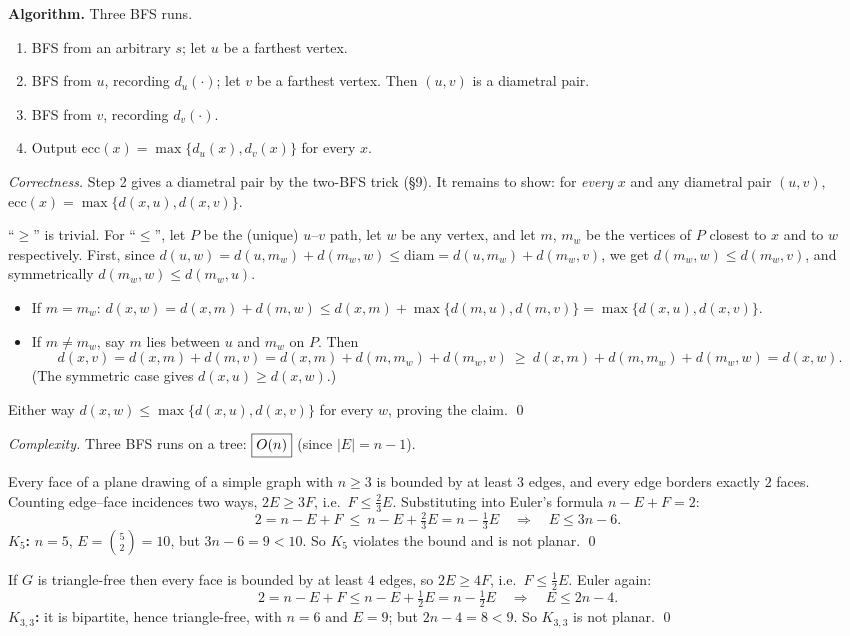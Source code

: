 \textbf{Algorithm.} Three BFS runs.
\begin{enumerate}
  \item BFS from an arbitrary $s$; let $u$ be a farthest vertex.
  \item BFS from $u$, recording $d_u(\cdot)$; let $v$ be a farthest vertex. Then $(u,v)$ is a
        diametral pair.
  \item BFS from $v$, recording $d_v(\cdot)$.
  \item Output $\mathrm{ecc}(x)=\max\{d_u(x),d_v(x)\}$ for every $x$.
\end{enumerate}
\emph{Correctness.} Step 2 gives a diametral pair by the two-BFS trick (\S9). It remains to show:
for \emph{every} $x$ and any diametral pair $(u,v)$,
$\mathrm{ecc}(x)=\max\{d(x,u),d(x,v)\}$.

``$\ge$'' is trivial. For ``$\le$'', let $P$ be the (unique) $u$--$v$ path, let $w$ be any vertex,
and let $m$, $m_w$ be the vertices of $P$ closest to $x$ and to $w$ respectively.
First, since $d(u,w)=d(u,m_w)+d(m_w,w)\le\mathrm{diam}=d(u,m_w)+d(m_w,v)$, we get
$d(m_w,w)\le d(m_w,v)$, and symmetrically $d(m_w,w)\le d(m_w,u)$.
\begin{itemize}
  \item If $m=m_w$: $d(x,w)=d(x,m)+d(m,w)\le d(x,m)+\max\{d(m,u),d(m,v)\}=\max\{d(x,u),d(x,v)\}$.
  \item If $m\ne m_w$, say $m$ lies between $u$ and $m_w$ on $P$. Then
        \[
          d(x,v)=d(x,m)+d(m,v)=d(x,m)+d(m,m_w)+d(m_w,v)\ \ge\ d(x,m)+d(m,m_w)+d(m_w,w)=d(x,w).
        \]
        (The symmetric case gives $d(x,u)\ge d(x,w)$.)
\end{itemize}
Either way $d(x,w)\le\max\{d(x,u),d(x,v)\}$ for every $w$, proving the claim. \qed

\emph{Complexity.} Three BFS runs on a tree: $\boxed{O(n)}$ (since $|E|=n-1$).

 Every face of a plane drawing of a simple graph with $n\ge3$ is bounded by at least $3$
edges, and every edge borders exactly $2$ faces. Counting edge--face incidences two ways,
$2E\ge3F$, i.e.\ $F\le\tfrac23E$. Substituting into Euler's formula $n-E+F=2$:
\[
  2=n-E+F\ \le\ n-E+\tfrac23E=n-\tfrac13E
  \quad\Longrightarrow\quad E\le3n-6 .
\]
\textbf{$K_5$:} $n=5$, $E=\binom52=10$, but $3n-6=9<10$. So $K_5$ violates the bound and is not
planar. \qed

 If $G$ is triangle-free then every face is bounded by at least $4$ edges, so $2E\ge4F$,
i.e.\ $F\le\tfrac12E$. Euler again:
\[
  2=n-E+F\le n-E+\tfrac12E=n-\tfrac12E
  \quad\Longrightarrow\quad E\le2n-4 .
\]
\textbf{$K_{3,3}$:} it is bipartite, hence triangle-free, with $n=6$ and $E=9$; but
$2n-4=8<9$. So $K_{3,3}$ is not planar. \qed

